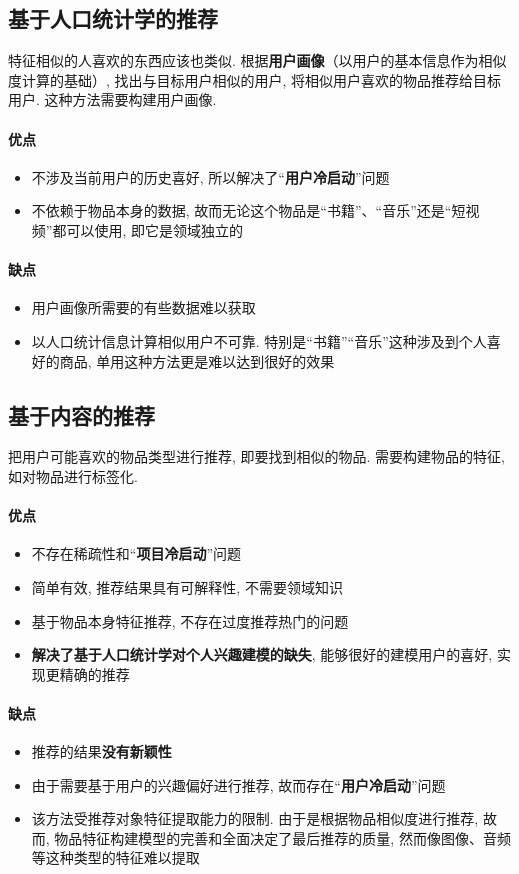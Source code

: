 \subsection{基于人口统计学的推荐}
特征相似的人喜欢的东西应该也类似. 根据\textbf{用户画像}（以用户的基本信息作为相似度计算的基础）, 找出与目标用户相似的用户, 将相似用户喜欢的物品推荐给目标用户. 这种方法需要构建用户画像. 
\paragraph{优点}
\begin{itemize}
	\item 不涉及当前用户的历史喜好, 所以解决了“\textbf{用户冷启动}”问题
	\item 不依赖于物品本身的数据, 故而无论这个物品是“书籍”、“音乐”还是“短视频”都可以使用, 即它是领域独立的
\end{itemize}

\paragraph{缺点}
\begin{itemize}
	\item 用户画像所需要的有些数据难以获取
	\item 以人口统计信息计算相似用户不可靠. 特别是“书籍”“音乐”这种涉及到个人喜好的商品, 单用这种方法更是难以达到很好的效果
\end{itemize}

\subsection{基于内容的推荐}
把用户可能喜欢的物品类型进行推荐, 即要找到相似的物品. 需要构建物品的特征, 如对物品进行标签化. 
\paragraph{优点}
\begin{itemize}
	\item 不存在稀疏性和“\textbf{项目冷启动}”问题
	\item 简单有效, 推荐结果具有可解释性, 不需要领域知识
	\item 基于物品本身特征推荐, 不存在过度推荐热门的问题
	\item \textbf{解决了基于人口统计学对个人兴趣建模的缺失}, 能够很好的建模用户的喜好, 实现更精确的推荐
\end{itemize}

\paragraph{缺点}
\begin{itemize}
	\item 推荐的结果\textbf{没有新颖性}
	\item 由于需要基于用户的兴趣偏好进行推荐, 故而存在“\textbf{用户冷启动}”问题
	\item 该方法受推荐对象特征提取能力的限制. 由于是根据物品相似度进行推荐, 故而, 物品特征构建模型的完善和全面决定了最后推荐的质量, 然而像图像、音频等这种类型的特征难以提取
\end{itemize}

